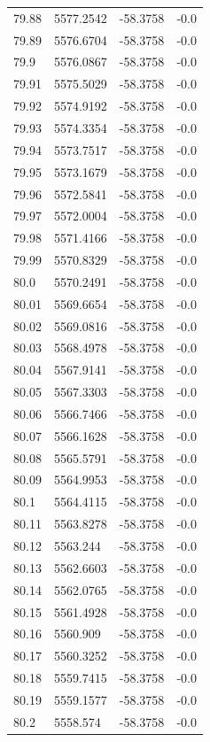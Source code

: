 \begin{table}[H]
\begin{tabular}{llll}
79.88 & 5577.2542 & -58.3758 & -0.0 \\
79.89 & 5576.6704 & -58.3758 & -0.0 \\
79.9 & 5576.0867 & -58.3758 & -0.0 \\
79.91 & 5575.5029 & -58.3758 & -0.0 \\
79.92 & 5574.9192 & -58.3758 & -0.0 \\
79.93 & 5574.3354 & -58.3758 & -0.0 \\
79.94 & 5573.7517 & -58.3758 & -0.0 \\
79.95 & 5573.1679 & -58.3758 & -0.0 \\
79.96 & 5572.5841 & -58.3758 & -0.0 \\
79.97 & 5572.0004 & -58.3758 & -0.0 \\
79.98 & 5571.4166 & -58.3758 & -0.0 \\
79.99 & 5570.8329 & -58.3758 & -0.0 \\
80.0 & 5570.2491 & -58.3758 & -0.0 \\
80.01 & 5569.6654 & -58.3758 & -0.0 \\
80.02 & 5569.0816 & -58.3758 & -0.0 \\
80.03 & 5568.4978 & -58.3758 & -0.0 \\
80.04 & 5567.9141 & -58.3758 & -0.0 \\
80.05 & 5567.3303 & -58.3758 & -0.0 \\
80.06 & 5566.7466 & -58.3758 & -0.0 \\
80.07 & 5566.1628 & -58.3758 & -0.0 \\
80.08 & 5565.5791 & -58.3758 & -0.0 \\
80.09 & 5564.9953 & -58.3758 & -0.0 \\
80.1 & 5564.4115 & -58.3758 & -0.0 \\
80.11 & 5563.8278 & -58.3758 & -0.0 \\
80.12 & 5563.244 & -58.3758 & -0.0 \\
80.13 & 5562.6603 & -58.3758 & -0.0 \\
80.14 & 5562.0765 & -58.3758 & -0.0 \\
80.15 & 5561.4928 & -58.3758 & -0.0 \\
80.16 & 5560.909 & -58.3758 & -0.0 \\
80.17 & 5560.3252 & -58.3758 & -0.0 \\
80.18 & 5559.7415 & -58.3758 & -0.0 \\
80.19 & 5559.1577 & -58.3758 & -0.0 \\
80.2 & 5558.574 & -58.3758 & -0.0 \\

\end{tabular}
\end{table}
